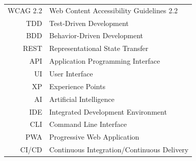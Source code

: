 \documentclass[czech,master,oneside]{ctufit-thesis}
\begin{document}
\begin{tabular}{rl}
    WCAG 2.2 & Web Content Accessibility Guidelines 2.2 \\
    TDD & Test-Driven Development \\
    BDD & Behavior-Driven Development \\
    REST & Representational State Transfer \\
	API   & Application Programming Interface                 \\
	UI   & User Interface                 \\
	XP   & Experience Points                 \\
    AI   & Artificial Intelligence                 \\
    IDE  & Integrated Development Environment                 \\
    CLI  & Command Line Interface                 \\
    PWA  & Progressive Web Application                 \\
    CI/CD & Continuous Integration/Continuous Delivery                 \\
\end{tabular}
\resumeTOCentries
\mainmatter\mainmatterinit %





















\end{document}
